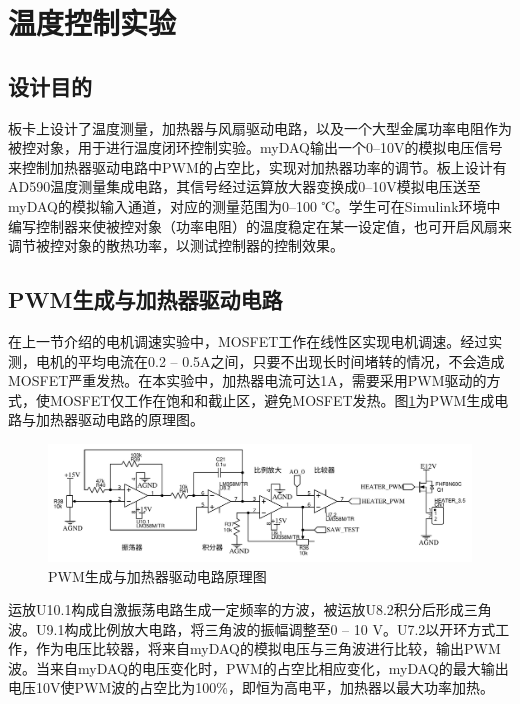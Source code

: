 \documentclass[11pt,a4paper]{article}
\begin{document}
\section{温度控制实验}

\subsection{设计目的}
板卡上设计了温度测量，加热器与风扇驱动电路，以及一个大型金属功率电阻作为被控对象，用于进行温度闭环控制实验。myDAQ输出一个0--10V的模拟电压信号来控制加热器驱动电路中PWM的占空比，实现对加热器功率的调节。板上设计有AD590温度测量集成电路，其信号经过运算放大器变换成0--10V模拟电压送至myDAQ的模拟输入通道，对应的测量范围为0--100 ℃。学生可在Simulink环境中编写控制器来使被控对象（功率电阻）的温度稳定在某一设定值，也可开启风扇来调节被控对象的散热功率，以测试控制器的控制效果。

\subsection{PWM生成与加热器驱动电路}
在上一节介绍的电机调速实验中，MOSFET工作在线性区实现电机调速。经过实测，电机的平均电流在0.2 -- 0.5A之间，只要不出现长时间堵转的情况，不会造成MOSFET严重发热。在本实验中，加热器电流可达1A，需要采用PWM驱动的方式，使MOSFET仅工作在饱和和截止区，避免MOSFET发热。图\ref{temp_pwm_sch}为PWM生成电路与加热器驱动电路的原理图。
\begin{figure}[h!]\centering
  \includegraphics[width=14cm]{./figs/temp_pwm_sch.pdf}
  \caption{PWM生成与加热器驱动电路原理图}\label{temp_pwm_sch}
\end{figure}

运放U10.1构成自激振荡电路生成一定频率的方波，被运放U8.2积分后形成三角波。U9.1构成比例放大电路，将三角波的振幅调整至0 -- 10 V。U7.2以开环方式工作，作为电压比较器，将来自myDAQ的模拟电压与三角波进行比较，输出PWM波。当来自myDAQ的电压变化时，PWM的占空比相应变化，myDAQ的最大输出电压10V使PWM波的占空比为100\%，即恒为高电平，加热器以最大功率加热。
\end{document}
